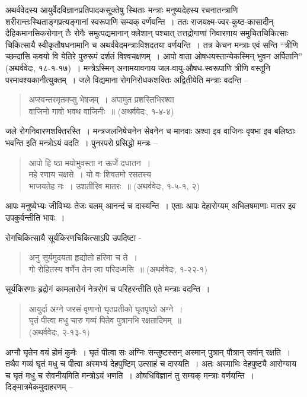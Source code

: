 {अथर्ववेदस्य आयुर्वेदविज्ञानप्रतिपादकसूक्तेषु स्थिताः मन्त्राः मनुष्यदेहस्य रचनातन्त्राणि \-शरीरान्तःस्थिताङ्गप्रत्यङ्गानां स्वरूपाणि सम्यक् वर्णयन्ति~। ततः राजयक्ष्म-ज्वर-कुष्ठ-\break कासादीन् दैहिकमानसिकरोगान् तैः रोगैः समुत्पद्यमानान् क्लेशान् पश्चात् तत्तद्रोगाणां \break निवारणाय समुचितचिकित्साः चिकित्सायै स्वीकृतौषधनामानि च अथर्ववेदमन्त्राः\break विशदतया वर्णयन्ति~। तत्र केचन मन्त्राः एवं सन्ति “{त्रीणि च्छन्दांसि कवयो वि येतिरे \-पुरुरूपं दर्शतं विश्वचक्षणम्~। आपो वाता ओषधयस्तान्येकस्मिन् भुवन अर्पितानि}” \-(अथर्ववेदः, १८-१-१७)~। मन्त्रेऽस्मिन् अनामयावनाय जल-वायु-औषध-स्वरूपाणि \-त्रीणि वस्तूनि परमावश्यकानीत्युक्तम्~। जले विद्यमाना रोगनिरोधकशक्तिः अद्वितीयेति मन्त्राः वदन्ति –
\begin{verse}
{अप्स्वन्तरमृतमप्सु भेषजम्~। अपामुत प्रशस्तिभिरश्वा}\\
{वाजिनो गावो भवथ वाजिनीः~॥} (अथर्ववेदः, १-४-४)
\end{verse}
जले रोगनिवारणशक्तिरस्ति~। मन्त्रजलनिषेचनेन सेवनेन च मानवाः अश्वा इव वाजिनः वृषभा इव बलिष्ठाः भवन्ति इति मन्त्रोऽयं वदति~। पुनरपरो प्रसिद्धो मन्त्रः –

\begin{verse}
{आपो हि ष्ठा मयोभुवस्ता न ऊर्जे दधातन~। }\\
{महे रणाय चक्षसे~। यो वः शिवतमो रसतस्य}\\
{भाजयतेह नः~। उशतीरिव मातरः~॥} (अथर्ववेदः, १-५-१, २)
\end{verse}

आपः मनुष्येभ्यः जीविभ्यः तेजः बलम् आनन्दं च दास्यन्ति~। एताः आपः देहारोग्यम् अभिलषमाणाः मातर इव उपकुर्वन्तीति भावः~। 

रोगचिकित्सायै सूर्यकिरणचिकित्साऽपि उपदिष्टा -

\begin{verse}
{अनु सूर्यमुदयता हृद्योतो हरिमा च ते~। }\\
{गो रोहितस्य वर्णेन तेन त्वा परिदध्मसि~॥} (अथर्ववेदः, १-२२-१)
\end{verse}

सूर्यकिरणाः हृद्रोगं कामलारोगं नेत्ररोगं च परिहरन्तीति एते मन्त्राः वदन्ति~। 

\begin{verse}
{आयुर्दा अग्ने जरसं वृणानो घृतप्रतीको घृतपृष्ठो अग्ने~। }\\
{घृतं पीत्वा मधु चारु गव्यं पितेव पुत्रानभि रक्षतादिमम्~॥}\\
\hspace{6cm}(अथर्ववेदः, २-१३-१)
\end{verse}

अग्नौ घृतेन वयं होमं कुर्मः~। घृतं पीत्वा सः अग्निः सन्तुष्टस्सन् अस्मान् पुत्रान् पौत्रान् सर्वान् रक्षति~। तथैव गव्यं घृतं मधु च पीत्वा अस्मभ्यं देहपुष्टिम् उत्साहं च दास्यति~। अतः अस्माभिः देहपुष्ट्यै आरोग्याय च घृतं मधु च सेवनीयमिति मन्त्रोऽयं भणति~। ओषधिविज्ञानं तु सम्यक् मन्त्राः वर्णयन्ति~। दिङ्मात्रमेकमुदाहरणम् –

}
